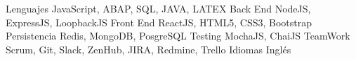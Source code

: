 


\begin{cvskills}

\cvskill
{Lenguajes} %
{JavaScript, ABAP, SQL, JAVA, LATEX } %
\cvskill
{Back End} %
{NodeJS, ExpressJS, LoopbackJS} %
\cvskill
{Front End} %
{ReactJS, HTML5, CSS3, Bootstrap} %
\cvskill
{Persistencia} %
{Redis, MongoDB, PosgreSQL} %
\cvskill
{Testing} %
{MochaJS, ChaiJS} %
\cvskill
{TeamWork} %
{Scrum, Git, Slack, ZenHub, JIRA, Redmine, Trello} %
\cvskill
{Idiomas} %
{Inglés} %
\end{cvskills}
